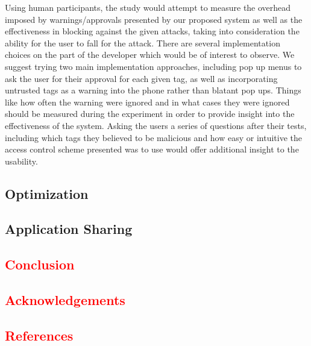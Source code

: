 \documentclass[12pt]{article}
\newcommand\TODO[1]{\textcolor{red}{#1}}
\begin{document}
Using human participants, the study would attempt to measure the overhead imposed by warnings/approvals presented by our proposed system as well as the effectiveness in blocking against the given attacks, taking into consideration the ability for the user to fall for the attack. There are several implementation choices on the part of the developer which would be of interest to observe. We suggest trying two main implementation approaches, including pop up menus to ask the user for their approval for each given tag, as well as incorporating untrusted tags as a warning into the phone rather than blatant pop ups. Things like how often the warning were ignored and in what cases they were ignored should be measured during the experiment in order to provide insight into the effectiveness of the system. Asking the users a series of questions after their tests, including which tags they believed to be malicious and how easy or intuitive the access control scheme presented was to use would offer additional insight to the usability. 

\subsection{Optimization}

\subsection{Application Sharing}

\TODO{\section{Conclusion}}

\TODO{\section{Acknowledgements}}

\TODO{\section{References}}



\end{document}
